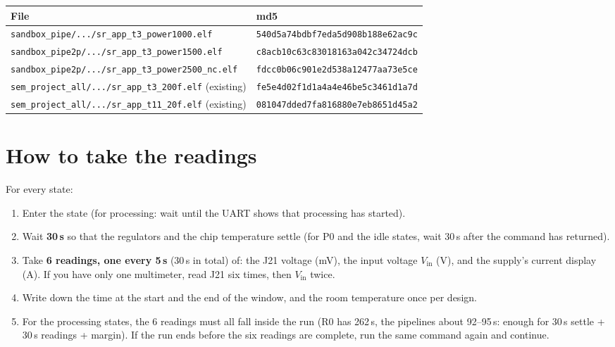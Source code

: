 \documentclass[11pt,a4paper]{article}
\begin{document}
\begin{tabularx}{\textwidth}{@{}lL@{}}
\toprule
\textbf{File} & \textbf{md5} \\ \midrule
\texttt{sandbox\_pipe/.../sr\_app\_t3\_power1000.elf} & \texttt{540d5a74bdbf7eda5d908b188e62ac9c} \\
\texttt{sandbox\_pipe2p/.../sr\_app\_t3\_power1500.elf} & \texttt{c8acb10c63c83018163a042c34724dcb} \\
\texttt{sandbox\_pipe2p/.../sr\_app\_t3\_power2500\_nc.elf} & \texttt{fdcc0b06c901e2d538a12477aa73e5ce} \\
\texttt{sem\_project\_all/.../sr\_app\_t3\_200f.elf} (existing) & \texttt{fe5e4d02f1d1a4a4e46be5c3461d1a7d} \\
\texttt{sem\_project\_all/.../sr\_app\_t11\_20f.elf} (existing) & \texttt{081047dded7fa816880e7eb8651d45a2} \\
\bottomrule
\end{tabularx}

\section{How to take the readings}\label{sec:read}

For every state:
\begin{enumerate}
  \item Enter the state (for processing: wait until the UART shows that processing has started).
  \item Wait \textbf{30\,s} so that the regulators and the chip temperature settle (for P0 and the idle states, wait 30\,s after the command has returned).
  \item Take \textbf{6 readings, one every 5\,s} (30\,s in total) of: the J21 voltage (mV), the input voltage $V_\mathrm{in}$ (V), and the supply's current display (A). If you have only one multimeter, read J21 six times, then $V_\mathrm{in}$ twice.
  \item Write down the time at the start and the end of the window, and the room temperature once per design.
  \item For the processing states, the 6 readings must all fall inside the run (R0 has 262\,s, the pipelines about 92--95\,s: enough for 30\,s settle + 30\,s readings + margin). If the run ends before the six readings are complete, run the same command again and continue.
\end{enumerate}
\end{document}
